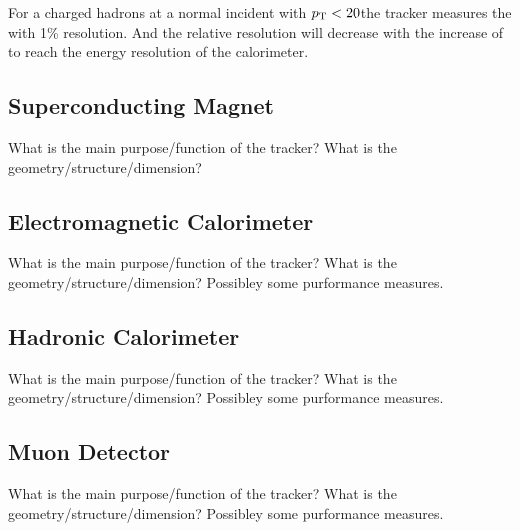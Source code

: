 For a charged hadrons at a normal incident with $p_{\mathrm{T}} < 20$\GeV the tracker measures the \pt with 1\% resolution. And the relative resolution will decrease with the increase of \pt to reach the energy resolution of the calorimeter.

\subsection{Superconducting Magnet}

What is the main purpose/function of the tracker?
What is the geometry/structure/dimension?

\subsection{Electromagnetic Calorimeter}

What is the main purpose/function of the tracker?
What is the geometry/structure/dimension?
Possibley some purformance measures.

\subsection{Hadronic Calorimeter}

What is the main purpose/function of the tracker?
What is the geometry/structure/dimension?
Possibley some purformance measures.

\subsection{Muon Detector}

What is the main purpose/function of the tracker?
What is the geometry/structure/dimension?
Possibley some purformance measures.

